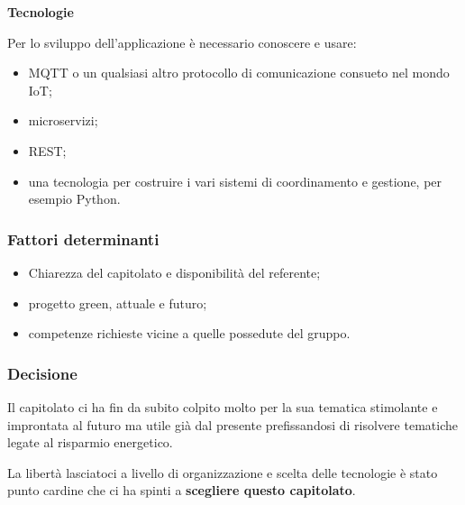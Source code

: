 \textbf{Tecnologie}

Per lo sviluppo dell'applicazione è necessario conoscere e usare:
\begin{itemize}
    \item MQTT o un qualsiasi altro protocollo di comunicazione consueto nel mondo IoT;
    \item microservizi;
    \item REST;
    \item una tecnologia per costruire i vari sistemi di coordinamento e gestione, per esempio Python.
\end{itemize}



\subsubsection{Fattori determinanti}
\begin{itemize}
    \item Chiarezza del capitolato e disponibilità del referente;
    \item progetto green, attuale e futuro;
    \item competenze richieste vicine a quelle possedute del gruppo.
\end{itemize}

\subsubsection{Decisione}
Il capitolato ci ha fin da subito colpito molto per la sua tematica stimolante e improntata al futuro ma utile già dal presente prefissandosi di risolvere tematiche legate al risparmio energetico.

La libertà lasciatoci a livello di organizzazione e scelta delle tecnologie è stato punto cardine che ci ha spinti a \textbf{scegliere questo capitolato}.
